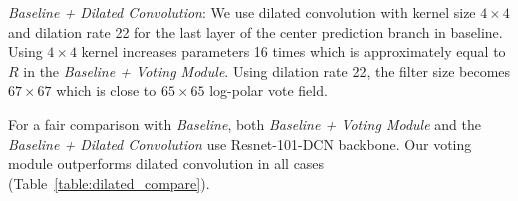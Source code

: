 \documentclass[runningheads]{llncs}
\begin{document}
\textit{Baseline + Dilated Convolution}: We use dilated convolution with kernel size $4 \times 4$ and dilation rate 22 for the last layer of the center prediction branch in baseline. Using  $4 \times 4$ kernel increases parameters  16 times which is approximately equal to $R$ in the \textit{Baseline  +  Voting Module}. Using dilation rate 22, the filter size becomes  $67 \times 67$ which is close to $65 \times 65$ log-polar vote field.















For a fair comparison with  \textit{Baseline}, both \textit{Baseline +  Voting Module} and the \textit{Baseline + Dilated Convolution}
use Resnet-101-DCN backbone.
Our voting module outperforms dilated convolution  in all cases (Table~\ref{table:dilated_compare}).
\end{document}
